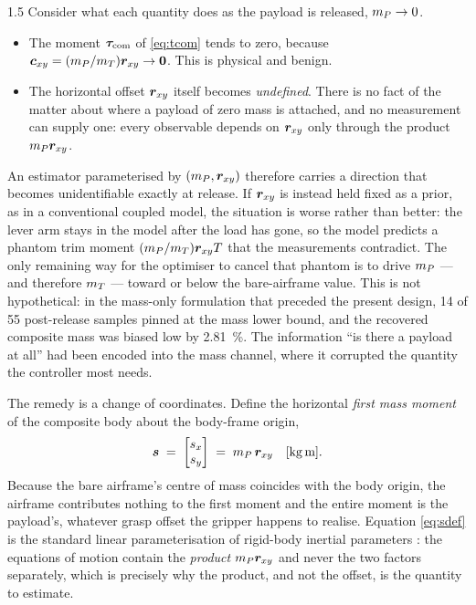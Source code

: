 \begin{spacing}{1.5}
Consider what each quantity does as the payload is released, $m_P \to 0$.

\begin{itemize}
\item The moment $\bm{\tau}_{\mathrm{com}}$ of \eqref{eq:tcom} tends to zero, because
$\bm{c}_{xy} = (m_P/m_T)\bm{r}_{xy} \to \bm{0}$. This is physical and benign.
\item The horizontal offset $\bm{r}_{xy}$ itself becomes \emph{undefined}. There
is no fact of the matter about where a payload of zero mass is attached, and no
measurement can supply one: every observable depends on $\bm{r}_{xy}$ only
through the product $m_P\bm{r}_{xy}$.
\end{itemize}

An estimator parameterised by $(m_P, \bm{r}_{xy})$ therefore carries a direction
that becomes unidentifiable exactly at release. If $\bm{r}_{xy}$ is instead held
fixed as a prior, as in a conventional coupled model, the situation is worse
rather than better: the lever arm stays in the model after the load has gone, so
the model predicts a phantom trim moment $(m_P/m_T)\bm{r}_{xy}{}T$ that the
measurements contradict. The only remaining way for the optimiser to cancel that
phantom is to drive $m_P$ --- and therefore $m_T$ --- toward or below the
bare-airframe value. This is not hypothetical: in the mass-only formulation that
preceded the present design, 14 of 55 post-release samples pinned at the mass
lower bound, and the recovered composite mass was biased low by
\SI{2.81}{\percent}. The information ``is there a payload at all'' had been
encoded into the mass channel, where it corrupted the quantity the controller
most needs.

The remedy is a change of coordinates. Define the horizontal \emph{first mass
moment} of the composite body about the body-frame origin,
\begin{equation}
\svec \;=\; \begin{bmatrix} s_x \\ s_y\end{bmatrix}
\;=\; \mP\,\rxy \quad [\si{\kg\meter}].
\label{eq:sdef}
\end{equation}
Because the bare airframe's centre of mass coincides with the body origin, the
airframe contributes nothing to the first moment and the entire moment is the
payload's, whatever grasp offset the gripper happens to realise. Equation
\eqref{eq:sdef} is the standard linear parameterisation of rigid-body inertial
parameters \cite{atkeson1986}: the equations of motion contain the \emph{product}
$m_P\bm{r}_{xy}$ and never the two factors separately, which is precisely why the
product, and not the offset, is the quantity to estimate.


\end{spacing}
